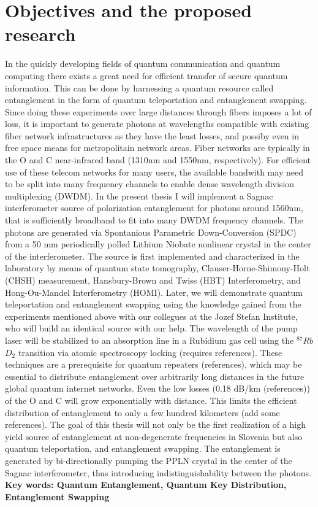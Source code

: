 \documentclass{article}
\theoremstyle{mytheoremstyle}
\theoremstyle{mytheoremstyle}
\theoremstyle{myproblemstyle}
\begin{document}
\section{Objectives and the proposed research}
In the quickly developing fields of quantum communication and quantum computing there exists a great need for efficient transfer of secure quantum information. This can be done
by harnessing a quantum resource called entanglement in the form of quantum teleportation and entanglement swapping. Since doing these experiments over large distances through
fibers imposes a lot of loss, it is important to generate photons at wavelengths compatible with existing fiber network infrastructures \cite{Kimble_2008} as they have the least losses,
and possiby even in free space \cite{Kržić_et_al_2023} means for metropolitain network areas. Fiber networks are typically in the O and C near-infrared band (1310nm and 1550nm, respectively). For
efficient use of these telecom networks for many users, the available bandwith may need to be split into many frequency channels to enable dense wavelength division multiplexing (DWDM).
In the present thesis I will implement a Sagnac interferometer source of polarization entanglement for photons around 1560nm, that is sufficiently broadband
to fit into many DWDM frequency channels. The photons are generated via Spontanious Parametric Down-Conversion (SPDC) from a 50 mm periodically polled Lithium Niobate
nonlinear crystal in the center of the interferometer. The source is first implemented and characterized in the laboratory by means of quantum state tomography,
Clauser-Horne-Shimony-Holt \cite{Clauser_Horne_Shimony_Holt_1969} (CHSH)  measurement, Hansbury-Brown and Twiss \cite{Brown_Twiss_1954} (HBT) Interferometry, and Hong-Ou-Mandel Interferometry \cite{Hong_Ou_Mandel_1987} (HOMI).
Later, we will demonstrate quantum teleportation \cite{Bouwmeester_Pan_Mattle_Eibl_Weinfurter_Zeilinger_1997} and entanglement swapping \cite{Jennewein_Weihs_Pan_Zeilinger_2001} using the knowledge 
gained from the experiments mentioned above with our collegues at the Jozef Stefan Institute, who will build an identical source with our help.
The wavelength of the pump laser will be stabilized to an absorption line in a Rubidium gas cell using the $^{87}Rb$ $D_2$ transition via atomic spectroscopy locking (requires references).
These techniques are a prerequisite for quantum repeaters (references),
which may be essential to distribute entanglement over arbitrarily long distances in the future global quantum internet networks. Even the low losses (0.18 dB/km (references)) of the O and C
will grow exponentially with distance. This limits the efficient distribution of entanglement to only a few hundred kilometers (add some references).
The goal of this thesis will not only be the first realization of a high yield source of entanglement at non-degenerate frequencies in Slovenia but also quantum teleportation, and entanglement swapping.
The entanglement is generated by bi-directionally pumping the PPLN crystal in the center of the Sagnac interferometer, thus introducing indistinguishability between the photons.\\
\textbf{Key words: Quantum Entanglement, Quantum Key Distribution, Entanglement Swapping}
\end{document}

